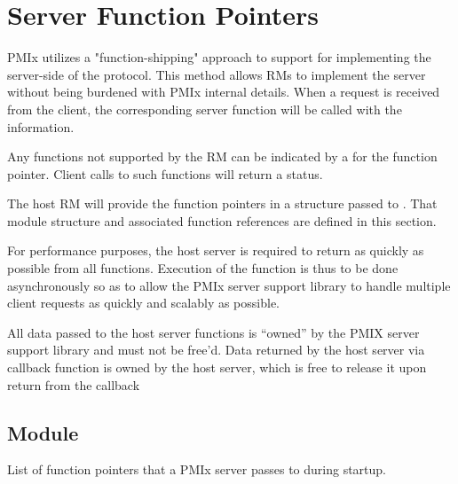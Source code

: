 \section{Server Function Pointers}

\ac{PMIx} utilizes a "function-shipping" approach to support for implementing the server-side of the protocol. This method allows \acp{RM} to implement the server without being burdened with \ac{PMIx} internal details. When a request is received from the client, the corresponding server function will be called with the information.

Any functions not supported by the \ac{RM} can be indicated by a  for the function pointer. Client calls to such functions will return a  status.

The host \ac{RM} will provide the function pointers in a  structure passed to .
That module structure and associated function references are defined in this section.

\advicermstart
For performance purposes, the host server is required to return as quickly as possible from all functions. Execution of
the function is thus to be done asynchronously so as to allow the \ac{PMIx} server support library to handle multiple client requests
as quickly and scalably as possible.

All data passed to the host server functions is ``owned'' by the
PMIX server support library and must not be free'd. Data returned
by the host server via callback function is owned by the host
server, which is free to release it upon return from the callback
\advicermend

\subsection{ Module}

\summary

List of function pointers that a PMIx server passes to  during startup.

\format

